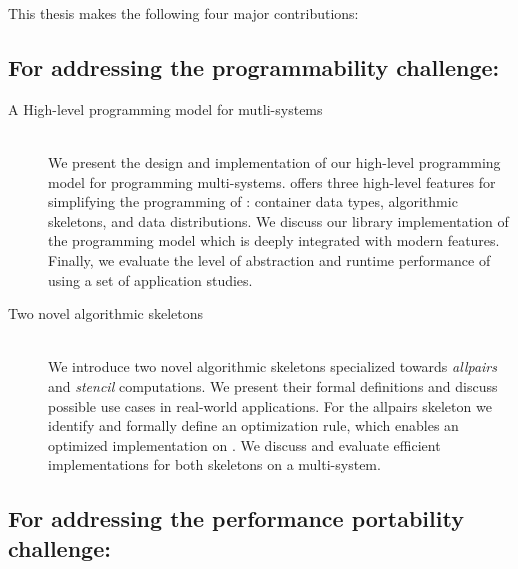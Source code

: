 This thesis makes the following four major contributions:

\subsection*{\hspace{2em}For addressing the programmability challenge:}

\begin{description}
  \item[A High-level programming model for mutli-\GPU systems]\hfill\\[-1em]
    We present the design and implementation of our high-level programming model \SkelCL for programming multi-\GPU systems.
    \SkelCL offers three high-level features for simplifying the programming of \GPUs: container data types, algorithmic skeletons, and data distributions.
    We discuss our \Cpp library implementation of the \SkelCL programming model which is deeply integrated with modern \Cpp features.
    Finally, we evaluate the level of abstraction and runtime performance of \SkelCL using a set of application studies.

  \item[Two novel algorithmic skeletons]\hfill\\[.25em]
    We introduce two novel algorithmic skeletons specialized towards \emph{allpairs} and \emph{stencil} computations.
    We present their formal definitions and discuss possible use cases in real-world applications.
    For the allpairs skeleton we identify and formally define an optimization rule, which enables an optimized implementation on \GPUs.
    We discuss and evaluate efficient implementations for both skeletons on a multi-\GPU system.
\end{description}

\subsection*{\hspace{2em}For addressing the performance portability challenge:}

